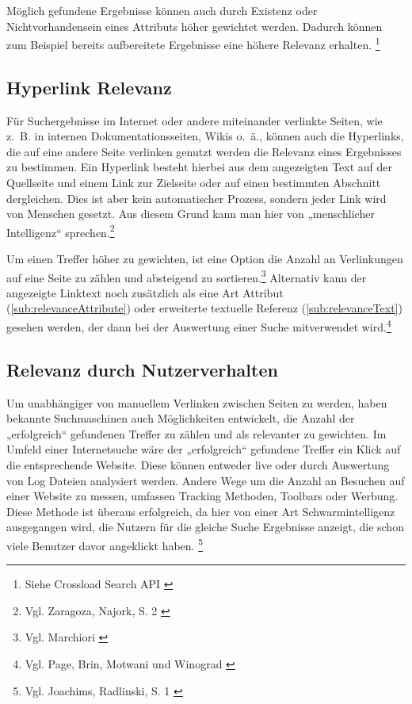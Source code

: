 Möglich gefundene Ergebnisse können auch durch Existenz oder Nichtvorhandensein eines Attributs höher gewichtet werden.
Dadurch können zum Beispiel bereits aufbereitete Ergebnisse eine höhere Relevanz erhalten. \footnote{Siehe Crossload Search API \cite{crossload2022}}

\subsection{Hyperlink Relevanz}
\label{sub:relevanceHyperlink}
Für Suchergebnisse im Internet oder andere miteinander verlinkte Seiten, wie z. B. in internen Dokumentationsseiten, Wikis o. ä., können auch die Hyperlinks,
die auf eine andere Seite verlinken genutzt werden die Relevanz eines Ergebnisses zu bestimmen.
Ein Hyperlink besteht hierbei aus dem angezeigten Text auf der Quellseite und einem Link zur Zielseite oder auf einen bestimmten Abschnitt dergleichen. Dies ist aber kein automatischer Prozess, sondern jeder Link wird von Menschen gesetzt. Aus diesem Grund kann man hier von „menschlicher Intelligenz“ sprechen.\footnote{Vgl. Zaragoza, Najork, S. 2 \cite{zaragoza2018}}

Um einen Treffer höher zu gewichten, ist eine Option die Anzahl an Verlinkungen auf eine Seite zu zählen und absteigend zu sortieren.\footnote{Vgl. Marchiori \cite{marchiori1997}}
Alternativ kann der angezeigte Linktext noch zusätzlich als eine Art Attribut (\ref{sub:relevanceAttribute}) oder erweiterte textuelle Referenz (\ref{sub:relevanceText}) gesehen werden, der dann bei der Auswertung einer Suche mitverwendet wird.\footnote{Vgl. Page, Brin, Motwani und Winograd \cite{ilprints422}}

\subsection{Relevanz durch Nutzerverhalten}
\label{sub:relevanceUser}
Um unabhängiger von manuellem Verlinken zwischen Seiten zu werden, haben bekannte Suchmaschinen auch Möglichkeiten entwickelt, die Anzahl der „erfolgreich“ gefundenen Treffer zu zählen und als relevanter zu gewichten.
Im Umfeld einer Internetsuche wäre der „erfolgreich“ gefundene Treffer ein Klick auf die entsprechende Website.
Diese können entweder live oder durch Auswertung von Log Dateien analysiert werden. Andere Wege um die Anzahl an Besuchen auf einer Website zu messen, umfassen Tracking Methoden, Toolbars oder Werbung.
Diese Methode ist überaus erfolgreich, da hier von einer Art Schwarmintelligenz ausgegangen wird, die Nutzern für die gleiche Suche Ergebnisse anzeigt, die schon viele Benutzer davor angeklickt haben. \footnote{Vgl. Joachims, Radlinski, S. 1 \cite{joachims2007}}

